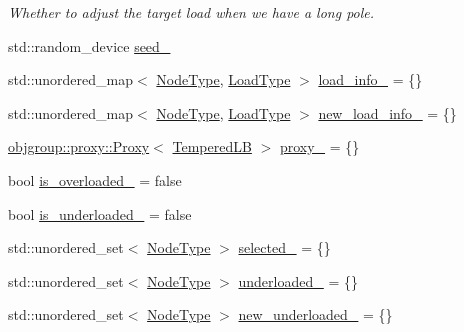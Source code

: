 \begin{DoxyCompactItemize}
\begin{DoxyCompactList}\small\item\em Whether to adjust the target load when we have a long pole. \end{DoxyCompactList}\item 
std\+::random\+\_\+device \hyperlink{structvt_1_1vrt_1_1collection_1_1lb_1_1_tempered_l_b_a2384a463adae3c446a12df983aa0c901}{seed\+\_\+}
\item 
std\+::unordered\+\_\+map$<$ \hyperlink{namespacevt_a866da9d0efc19c0a1ce79e9e492f47e2}{Node\+Type}, \hyperlink{namespacevt_a8fb51741340b87d7aaee0bef60e9896b}{Load\+Type} $>$ \hyperlink{structvt_1_1vrt_1_1collection_1_1lb_1_1_tempered_l_b_a0262ca11f901c152c0d13fa64701fb44}{load\+\_\+info\+\_\+} = \{\}
\item 
std\+::unordered\+\_\+map$<$ \hyperlink{namespacevt_a866da9d0efc19c0a1ce79e9e492f47e2}{Node\+Type}, \hyperlink{namespacevt_a8fb51741340b87d7aaee0bef60e9896b}{Load\+Type} $>$ \hyperlink{structvt_1_1vrt_1_1collection_1_1lb_1_1_tempered_l_b_a117b1bb212ced62335f93bfbc825ca9d}{new\+\_\+load\+\_\+info\+\_\+} = \{\}
\item 
\hyperlink{structvt_1_1objgroup_1_1proxy_1_1_proxy}{objgroup\+::proxy\+::\+Proxy}$<$ \hyperlink{structvt_1_1vrt_1_1collection_1_1lb_1_1_tempered_l_b}{Tempered\+LB} $>$ \hyperlink{structvt_1_1vrt_1_1collection_1_1lb_1_1_tempered_l_b_aca418d6158bfb01b3ab55224419f34be}{proxy\+\_\+} = \{\}
\item 
bool \hyperlink{structvt_1_1vrt_1_1collection_1_1lb_1_1_tempered_l_b_af7e60fc255a3ebe6625f48b622d61a84}{is\+\_\+overloaded\+\_\+} = false
\item 
bool \hyperlink{structvt_1_1vrt_1_1collection_1_1lb_1_1_tempered_l_b_a53aba7cc0f8809e7c69d660b79b7542c}{is\+\_\+underloaded\+\_\+} = false
\item 
std\+::unordered\+\_\+set$<$ \hyperlink{namespacevt_a866da9d0efc19c0a1ce79e9e492f47e2}{Node\+Type} $>$ \hyperlink{structvt_1_1vrt_1_1collection_1_1lb_1_1_tempered_l_b_a95bdd9680feda06ca966311f0e3ca9b3}{selected\+\_\+} = \{\}
\item 
std\+::unordered\+\_\+set$<$ \hyperlink{namespacevt_a866da9d0efc19c0a1ce79e9e492f47e2}{Node\+Type} $>$ \hyperlink{structvt_1_1vrt_1_1collection_1_1lb_1_1_tempered_l_b_a1fecccd06fbeae5e5632998140a3b3b7}{underloaded\+\_\+} = \{\}
\item 
std\+::unordered\+\_\+set$<$ \hyperlink{namespacevt_a866da9d0efc19c0a1ce79e9e492f47e2}{Node\+Type} $>$ \hyperlink{structvt_1_1vrt_1_1collection_1_1lb_1_1_tempered_l_b_a23d97f7d493c9e871e33748f90702dfe}{new\+\_\+underloaded\+\_\+} = \{\}

\end{DoxyCompactItemize}
